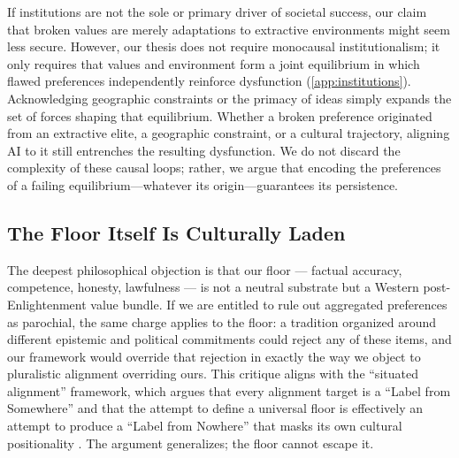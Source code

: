 \documentclass{article}
\theoremstyle{plain}
\theoremstyle{definition}
\theoremstyle{remark}
\begin{document}
If institutions are not the sole or primary driver of societal success, our claim that broken values are merely adaptations to extractive environments might seem less secure. However, our thesis does not require monocausal institutionalism; it only requires that values and environment form a joint equilibrium in which flawed preferences independently reinforce dysfunction (\cref{app:institutions}). Acknowledging geographic constraints \citep{sachs2003institutions} or the primacy of ideas \citep{mokyr2016culture} simply expands the set of forces shaping that equilibrium. Whether a broken preference originated from an extractive elite, a geographic constraint, or a cultural trajectory, aligning AI to it still entrenches the resulting dysfunction. We do not discard the complexity of these causal loops; rather, we argue that encoding the preferences of a failing equilibrium---whatever its origin---guarantees its persistence.

\subsection{The Floor Itself Is Culturally Laden}
\label{sec:alt-cultural}
The deepest philosophical objection is that our floor --- factual accuracy, competence, honesty, lawfulness --- is not a neutral substrate but a Western post-Enlightenment value bundle. If we are entitled to rule out aggregated preferences as parochial, the same charge applies to the floor: a tradition organized around different epistemic and political commitments could reject any of these items, and our framework would override that rejection in exactly the way we object to pluralistic alignment overriding ours. This critique aligns with the ``situated alignment'' framework, which argues that every alignment target is a ``Label from Somewhere'' and that the attempt to define a universal floor is effectively an attempt to produce a ``Label from Nowhere'' that masks its own cultural positionality \citep{arzberger2026label, wan2025noise}. The argument generalizes; the floor cannot escape it.
\end{document}

